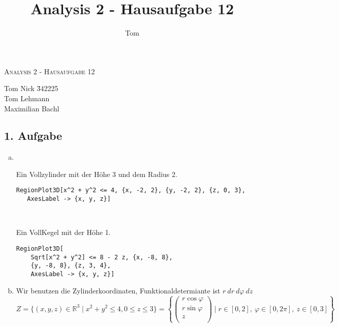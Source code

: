 \documentclass[10pt,a4paper,parskip=half]{scrartcl}
\author{Tom}
\title{Analysis 2 - Hausaufgabe 12}
\newcommand{\R}{\mathbb{R}}
\newcommand{\vecthree}[3]{\begin{pmatrix}#1\\#2\\#3\\\end {pmatrix}}
\begin{document}
\begin{center}
\textsc{\Large{Analysis 2 - Hausaufgabe 12}} \\
\end{center}
\begin{tabbing}
Tom Nick \hspace{1.4cm}\= 342225\\
Tom Lehmann\\
Maximilian Bachl
\end{tabbing}
\subsection*{1. Aufgabe}
\begin{enumerate}[(a)]
   \item \ \\
   \begin{minipage}{0.50\columnwidth}
   Ein Vollzylinder mit der Höhe 3 und dem Radius 2.
   \begin{lstlisting}[caption= Mathematica Code für die Menge Z]
   RegionPlot3D[x^2 + y^2 <= 4, {x, -2, 2}, {y, -2, 2}, {z, 0, 3}, 
   AxesLabel -> {x, y, z}]
   \end{lstlisting}
   \end{minipage}
   \begin{minipage}{0.50\columnwidth}
   \begin{center}
   \end{center}
   \end{minipage}
   \ \\
   \begin{minipage}{0.50\columnwidth}
   Ein VollKegel mit der Höhe 1.
   \begin{lstlisting}[caption= Mathematica Code für die Menge K]
   RegionPlot3D[
    Sqrt[x^2 + y^2] <= 8 - 2 z, {x, -8, 8}, 
    {y, -8, 8}, {z, 3, 4}, 
    AxesLabel -> {x, y, z}]
   \end{lstlisting}
   \end{minipage}
   \begin{minipage}{0.50\columnwidth}
   \begin{center}
   \end{center}
   \end{minipage}
   \item  
   Wir benutzen die Zylinderkoordinaten, Funktionaldetermiante ist $r~dr ~ d\varphi ~dz$
   \[ Z = \{ (x,y,z) \in \R^3  \mid x^2 + y^2 \le 4, 0 \le z \le 3\} = \left\{ \vecthree{r \cos \varphi}{r\sin \varphi}{z} \mid r \in [0,2] ,~ \varphi \in [0,2\pi], ~z \in [0,3] \right\} \] 

\end{enumerate}
\end{document}
